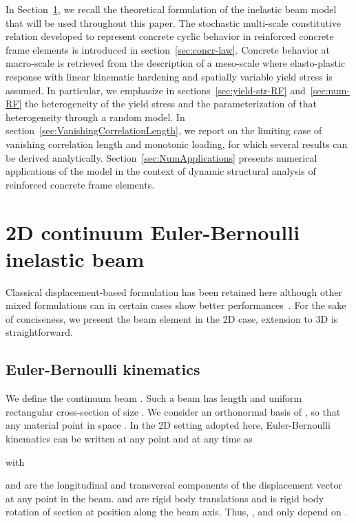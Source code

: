\documentclass[12p]{amsart}
\begin{document}
In Section~\ref{sec:beam_model}, we recall the theoretical formulation of the inelastic beam model that will be used throughout this paper. The stochastic multi-scale constitutive relation developed to represent concrete cyclic behavior in reinforced concrete frame elements is introduced in section~\ref{sec:concr-law}. Concrete behavior at macro-scale is retrieved from the description of a meso-scale where elasto-plastic response with linear kinematic hardening and spatially variable yield stress is assumed. In particular, we emphasize in sections~\ref{sec:yield-str-RF} and~\ref{sec:num-RF} the heterogeneity of the yield stress and the parameterization of that heterogeneity through a random model. In section~\ref{sec:VanishingCorrelationLength}, we report on the limiting case of vanishing correlation length and monotonic loading, for which several results can be derived analytically. Section~\ref{sec:NumApplications} presents numerical applications of the model in the context of dynamic structural analysis of reinforced concrete frame elements.

\section{2D continuum Euler-Bernoulli inelastic beam}\label{sec:beam_model}

Classical displacement-based formulation has been retained here although other mixed formulations can in certain cases show better performances~\cite{Tay-et-al2003}. For the sake of conciseness, we present the beam element in the 2D case, extension to 3D is straightforward.

\subsection{Euler-Bernoulli kinematics}

We define the continuum beam . Such a beam has length  and uniform rectangular cross-section  of size . We consider an orthonormal basis  of , so that any material point in space . In the 2D setting adopted here, Euler-Bernoulli kinematics can be written at any point  and at any time  as

with

 and  are the longitudinal and transversal components of the displacement vector  at any point in the beam.  and  are rigid body translations and  is rigid body rotation of section  at position  along the beam axis. Thus, ,  and  only depend on .
\end{document}
